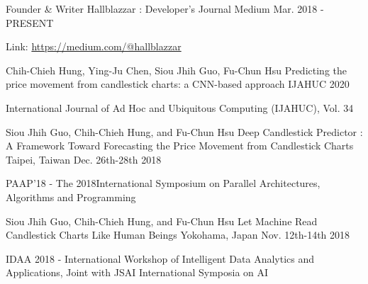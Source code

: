 

\begin{cventries}

    \cventry
        {Founder \& Writer} %
        {Hallblazzar : Developer's Journal} %
        {Medium} %
        {Mar. 2018 - PRESENT} %
        {
          \begin{cvitems} %
            \item {Link: \href{https://medium.com/@hallblazzar}{https://medium.com/@hallblazzar}}
          \end{cvitems}
        }

    \cventry
        {Chih-Chieh Hung, Ying-Ju Chen, Siou Jhih Guo, Fu-Chun Hsu}
        {Predicting the price movement from candlestick charts: a CNN-based approach}
        {IJAHUC}
        {2020}
        {
            \begin{cvitems}
                \item {International Journal of Ad Hoc and Ubiquitous Computing (IJAHUC), Vol. 34}
            \end{cvitems}
        }

    \cventry
        {Siou Jhih Guo, Chih-Chieh Hung, and Fu-Chun Hsu}
        {Deep Candlestick Predictor : A Framework Toward Forecasting the Price Movement from Candlestick Charts}
        {Taipei, Taiwan}
        {Dec. 26th-28th 2018}
        {
            \begin{cvitems}
                \item {PAAP’18 - The 2018International Symposium on Parallel Architectures, Algorithms and Programming}
            \end{cvitems}
        }

    \cventry
        {Siou Jhih Guo, Chih-Chieh Hung, and Fu-Chun Hsu}
        {Let Machine Read Candlestick Charts Like Human Beings}
        {Yokohama, Japan}
        {Nov. 12th-14th 2018}
        {
            \begin{cvitems}
                \item {IDAA 2018 - International Workshop of Intelligent Data Analytics and Applications, Joint with JSAI International Symposia on AI}
            \end{cvitems}
        }
        
\end{cventries}
